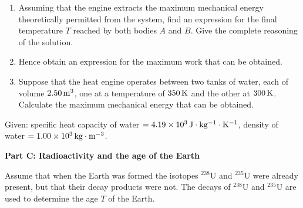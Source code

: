\begin{enumerate}
\item[(a)] Assuming that the engine extracts the maximum mechanical energy theoretically permitted from the system, find an expression for the final temperature $T$ reached by both bodies $A$ and $B$. Give the complete reasoning of the solution.
\item[(b)] Hence obtain an expression for the maximum work that can be obtained.
\item[(c)] Suppose that the heat engine operates between two tanks of water, each of volume $2.50\,\mathrm{m^3}$, one at a temperature of $350\,\mathrm{K}$ and the other at $300\,\mathrm{K}$. Calculate the maximum mechanical energy that can be obtained.
\end{enumerate}

Given: specific heat capacity of water $=4.19\times10^3\,\mathrm{J\cdot kg^{-1}\cdot K^{-1}}$, density of water $=1.00\times10^3\,\mathrm{kg\cdot m^{-3}}$.

\textbf{Part C: Radioactivity and the age of the Earth}

Assume that when the Earth was formed the isotopes $^{238}\mathrm{U}$ and $^{235}\mathrm{U}$ were already present, but that their decay products were not. The decays of $^{238}\mathrm{U}$ and $^{235}\mathrm{U}$ are used to determine the age $T$ of the Earth.

